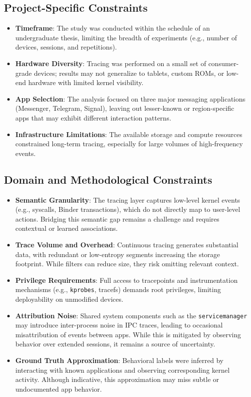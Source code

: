\documentclass[a4paper,12pt]{report}
\begin{document}
\subsection*{Project-Specific Constraints}

\begin{itemize}
\item \textbf{Timeframe}: The study was conducted within the schedule of an undergraduate thesis, limiting the breadth of experiments (e.g., number of devices, sessions, and repetitions).
\item \textbf{Hardware Diversity}: Tracing was performed on a small set of consumer-grade devices; results may not generalize to tablets, custom ROMs, or low-end hardware with limited kernel visibility.
\item \textbf{App Selection}: The analysis focused on three major messaging applications (Messenger, Telegram, Signal), leaving out lesser-known or region-specific apps that may exhibit different interaction patterns.
\item \textbf{Infrastructure Limitations}: The available storage and compute resources constrained long-term tracing, especially for large volumes of high-frequency events.
\end{itemize}

\subsection*{Domain and Methodological Constraints}

\begin{itemize}
\item \textbf{Semantic Granularity}: The tracing layer captures low-level kernel events (e.g., syscalls, Binder transactions), which do not directly map to user-level actions. Bridging this semantic gap remains a challenge and requires contextual or learned associations.
\item \textbf{Trace Volume and Overhead}: Continuous tracing generates substantial data, with redundant or low-entropy segments increasing the storage footprint. While filters can reduce size, they risk omitting relevant context.
\item \textbf{Privilege Requirements}: Full access to tracepoints and instrumentation mechanisms (e.g., \texttt{kprobes}, tracefs) demands root privileges, limiting deployability on unmodified devices.
\item \textbf{Attribution Noise}: Shared system components such as the \texttt{servicemanager} may introduce inter-process noise in IPC traces, leading to occasional misattribution of events between apps. While this is mitigated by observing behavior over extended sessions, it remains a source of uncertainty.
\item \textbf{Ground Truth Approximation}: Behavioral labels were inferred by interacting with known applications and observing corresponding kernel activity. Although indicative, this approximation may miss subtle or undocumented app behavior.
\end{itemize}
\end{document}
